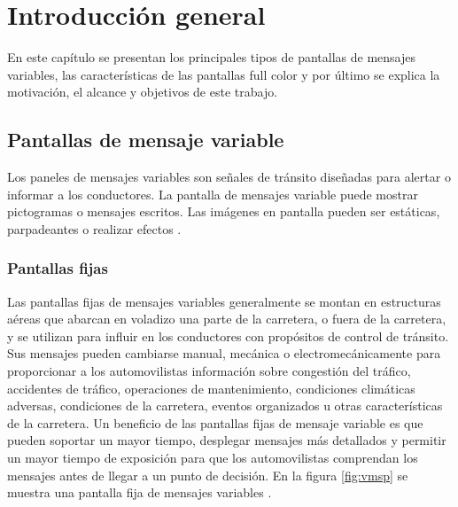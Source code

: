 
\chapter{Introducción general} %

\label{Chapter1} %
\label{IntroGeneral}
En este capítulo se presentan los principales tipos de pantallas de mensajes variables, las características de las pantallas full color y por último se explica la motivación, el alcance y objetivos de este trabajo.

\newcommand{\keyword}[1]{\textbf{#1}}
\newcommand{\tabhead}[1]{\textbf{#1}}
\newcommand{\code}[1]{\texttt{#1}}
\newcommand{\file}[1]{\texttt{\bfseries#1}}
\newcommand{\option}[1]{\texttt{\itshape#1}}
\newcommand{\grados}{$^{\circ}$}



\section{Pantallas de mensaje variable}

Los paneles de mensajes variables son señales de tránsito diseñadas para alertar o informar a los conductores. La pantalla de mensajes variable puede mostrar pictogramas o mensajes escritos. Las imágenes en pantalla pueden ser estáticas, parpadeantes o realizar efectos \cite{WIKIVMS}.


\subsection{Pantallas fijas}

Las pantallas fijas de mensajes variables generalmente se montan en estructuras aéreas que abarcan en voladizo una parte de la carretera, o fuera de la carretera, y se utilizan para influir en los conductores con propósitos de control de tránsito. Sus mensajes pueden cambiarse manual, mecánica o electromecánicamente para proporcionar a los automovilistas información sobre congestión del tráfico, accidentes de tráfico, operaciones de mantenimiento, condiciones climáticas adversas, condiciones de la carretera, eventos organizados u otras características de la carretera. Un beneficio de las pantallas fijas de mensaje variable es que pueden soportar un mayor tiempo, desplegar mensajes más detallados y permitir un mayor tiempo de exposición para que los automovilistas comprendan los mensajes antes de llegar a un punto de decisión. En la figura \ref{fig:vmsp} se muestra una pantalla fija de mensajes variables \citep{VMSTYPES}.


